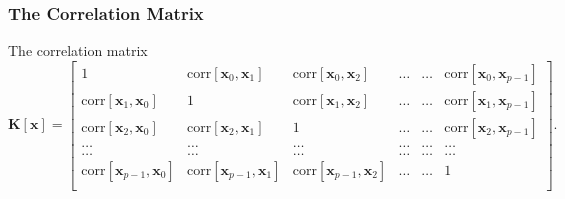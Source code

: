 \documentclass{beamer}
\begin{document}
\begin{frame}
\frametitle{The Correlation Matrix}

The correlation matrix
\[
\bm{K}[\bm{x}] = \begin{bmatrix}
1 & \mathrm{corr}[\bm{x}_0,\bm{x}_1]  & \mathrm{corr}[\bm{x}_0,\bm{x}_2] & \dots & \dots & \mathrm{corr}[\bm{x}_0,\bm{x}_{p-1}]\\
\mathrm{corr}[\bm{x}_1,\bm{x}_0] & 1  & \mathrm{corr}[\bm{x}_1,\bm{x}_2] & \dots & \dots & \mathrm{corr}[\bm{x}_1,\bm{x}_{p-1}]\\
\mathrm{corr}[\bm{x}_2,\bm{x}_0]   & \mathrm{corr}[\bm{x}_2,\bm{x}_1] & 1 & \dots & \dots & \mathrm{corr}[\bm{x}_2,\bm{x}_{p-1}]\\
\dots & \dots & \dots & \dots & \dots & \dots \\
\dots & \dots & \dots & \dots & \dots & \dots \\
\mathrm{corr}[\bm{x}_{p-1},\bm{x}_0]   & \mathrm{corr}[\bm{x}_{p-1},\bm{x}_1] & \mathrm{corr}[\bm{x}_{p-1},\bm{x}_{2}]  & \dots & \dots  & 1\\
\end{bmatrix}.
\]
\end{frame}
\end{document}
